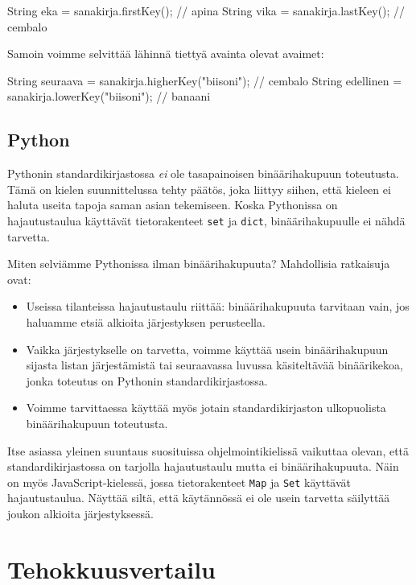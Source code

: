 \begin{code}
String eka = sanakirja.firstKey(); // apina
String vika = sanakirja.lastKey(); // cembalo
\end{code}

Samoin voimme selvittää lähinnä tiettyä avainta olevat avaimet:

\begin{code}
String seuraava = sanakirja.higherKey("biisoni"); // cembalo
String edellinen = sanakirja.lowerKey("biisoni"); // banaani
\end{code}

\subsection{Python}

Pythonin standardikirjastossa \emph{ei} ole 
tasapainoisen binäärihakupuun toteutusta.
Tämä on kielen suunnittelussa tehty päätös,
joka liittyy siihen, että kieleen ei haluta
useita tapoja saman asian tekemiseen.
Koska Pythonissa on hajautustaulua
käyttävät tietorakenteet \texttt{set} ja \texttt{dict},
binäärihakupuulle ei nähdä tarvetta.

Miten selviämme Pythonissa ilman binäärihakupuuta?
Mahdollisia ratkaisuja ovat:

\begin{itemize}
\item Useissa tilanteissa hajautustaulu riittää:
binäärihakupuuta tarvitaan vain, jos haluamme etsiä
alkioita järjestyksen perusteella.
\item Vaikka järjestykselle on tarvetta, voimme käyttää
usein binäärihaku\-puun sijasta listan järjestämistä tai
seuraavassa luvussa käsiteltävää binäärikekoa, jonka toteutus
on Pythonin standardikirjastossa.
\item Voimme tarvittaessa käyttää myös jotain standardikirjaston
ulkopuolista binäärihakupuun toteutusta.
\end{itemize}

Itse asiassa yleinen suuntaus suosituissa ohjelmointikielissä vaikuttaa olevan,
että standardikirjastossa on tarjolla hajautustaulu mutta ei
binääri\-hakupuuta. Näin on myös JavaScript-kielessä,
jossa tietorakenteet \texttt{Map} ja \texttt{Set} käyttävät hajautustaulua.
Näyttää siltä, että käytännössä ei ole usein tarvetta säilyttää
joukon alkioita järjestyksessä.

\section{Tehokkuusvertailu}

